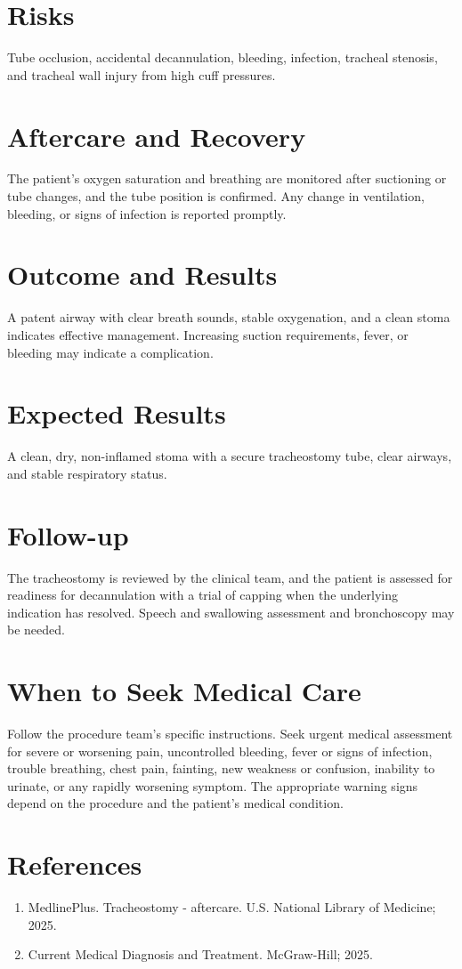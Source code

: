\section*{Risks}
Tube occlusion, accidental decannulation, bleeding, infection, tracheal stenosis, and tracheal wall injury from high cuff pressures.

\section*{Aftercare and Recovery}
The patient's oxygen saturation and breathing are monitored after suctioning or tube changes, and the tube position is confirmed. Any change in ventilation, bleeding, or signs of infection is reported promptly.

\section*{Outcome and Results}
A patent airway with clear breath sounds, stable oxygenation, and a clean stoma indicates effective management. Increasing suction requirements, fever, or bleeding may indicate a complication.
\section*{Expected Results}
A clean, dry, non-inflamed stoma with a secure tracheostomy tube, clear airways, and stable respiratory status.
\section*{Follow-up}
The tracheostomy is reviewed by the clinical team, and the patient is assessed for readiness for decannulation with a trial of capping when the underlying indication has resolved. Speech and swallowing assessment and bronchoscopy may be needed.
\section*{When to Seek Medical Care}
Follow the procedure team's specific instructions. Seek urgent medical assessment for severe or worsening pain, uncontrolled bleeding, fever or signs of infection, trouble breathing, chest pain, fainting, new weakness or confusion, inability to urinate, or any rapidly worsening symptom. The appropriate warning signs depend on the procedure and the patient's medical condition.

\section*{References}
\begin{enumerate}
  \item MedlinePlus. Tracheostomy - aftercare. U.S. National Library of Medicine; 2025.
  \item Current Medical Diagnosis and Treatment. McGraw-Hill; 2025.
\end{enumerate}

\clearpage
